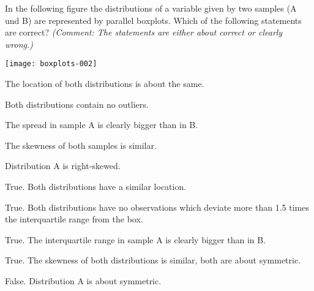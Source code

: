 
\begin{question}
In the following figure the distributions of a variable
given by two samples (A und B) are represented by parallel boxplots.
Which of the following statements are correct?  \emph{(Comment: The
statements are either about correct or clearly wrong.)}

\texttt{[image: boxplots-002]}

\begin{answerlist}
  \item The location of both distributions is about the same.
  \item Both distributions contain no outliers.
  \item The spread in sample A is clearly bigger than in B.
  \item The skewness of both samples is similar.
  \item Distribution A is right-skewed.
\end{answerlist}
\end{question}

\begin{solution}
\begin{answerlist}
  \item True. Both distributions have a similar location.
  \item True. Both distributions have no observations which deviate more than 1.5 times the interquartile range from the box.
  \item True. The interquartile range in sample A is  clearly bigger than in B.
  \item True. The skewness of both distributions is similar, both are about symmetric.
  \item False. Distribution  A  is  about symmetric.
\end{answerlist}
\end{solution}

